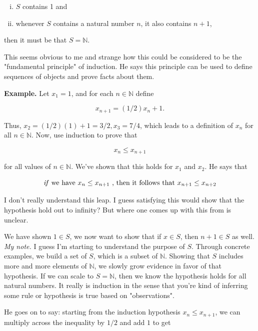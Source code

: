 \documentclass{article}
\numberwithin{equation}{subsection}
\numberwithin{theo}{subsection}
\begin{document}
\begin{enumerate}[(i)]
    \item $S$ contains 1 and
    \item whenever $S$ contains a natural number $n$, it also contains $n + 1$,
\end{enumerate}

then it must be that $S = \mathbb{N}$. 

This seems obvious to me and strange how this could be considered to be the
"fundamental principle" of induction. He says this principle can be used to
define sequences of objects and prove facts about them.

\textbf{Example.} Let $x_1 = 1$, and for each $n \in \mathbb{N}$ define

\begin{equation*}
    x_{n+1} = (1/2)x_n + 1.
\end{equation*}

Thus, $x_2 = (1/2)(1) + 1 = 3/2, x_3 = 7/4$, which leads to a definition of
$x_n$ for all $n \in \mathbb{N}$. Now, use induction to prove that

\begin{equation*}
    x_n \leq x_{n+1}
\end{equation*}

for all values of $n \in \mathbb{N}$. We've shown that this holds for $x_1$ and
$x_2$. He says that

\begin{equation*}
    \text{\emph{if} we have } x_n \leq x_{n+1}~\text{, then it follows that }
    x_{n+1} \leq x_{n+2}
\end{equation*}

I don't really understand this leap. I guess satisfying this would show that the
hypothesis hold out to infinity? But where one comes up with this from is
unclear.

We have shown $1 \in S$, we now want to show that if $x \in S$, then $n + 1 \in
S$ as well. \emph{My note.} I guess I'm starting to understand the purpose of
$S$. Through concrete examples, we build a set of $S$, which is a subset of
$\mathbb{N}$. Showing that $S$ includes more and more elements of $\mathbb{N}$,
we slowly grow evidence in favor of that hypothesis. If we can scale to $S =
\mathbb{N}$, then we know the hypothesis holds for all natural numbers. It
really is induction in the sense that you're kind of inferring some rule or
hypothesis is true based on "observations".

He goes on to say: starting from the induction hypothesis $x_n \leq x_{n+1}$, we
can multiply across the inequality by $1/2$ and add $1$ to get
\end{document}
